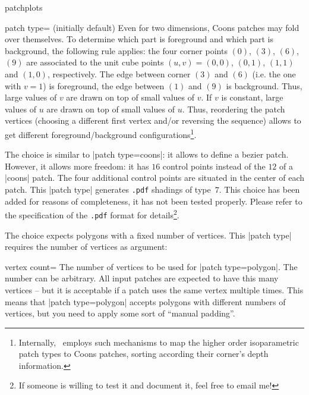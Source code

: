 \begin{pgfplotslibrary}{patchplots}
\begin{pgfplotskey}{patch type= (initially default)}
	Even for two dimensions, Coons patches may fold over themselves. To determine which part is foreground and which part is background, the following rule applies: the four corner points $(0)$, $(3)$, $(6)$, $(9)$ are associated to the unit cube points $(u,v) = (0,0)$, $(0,1)$, $(1,1)$ and $(1,0)$, respectively. The edge between corner $(3)$ and $(6)$ (i.e. the one with $v=1$) is foreground, the edge between $(1)$ and $(9)$ is background. Thus, large values of $v$ are drawn on top of small values of $v$. If $v$ is constant, large values of $u$ are drawn on top of small values of $u$. Thus, reordering the patch vertices (choosing a different first vertex and/or reversing the sequence) allows to get different foreground/background configurations\footnote{Internally, \PGFPlots\ employs such mechanisms to map the higher order isoparametric patch types to Coons patches, sorting according their corner's depth information.}.

	The choice  is similar to |patch type=coons|: it allows to define a bezier patch. However, it allows more freedom: it has $16$ control points instead of the $12$ of a |coons| patch. The four additional control points are situated in the center of each patch. This |patch type| generates \texttt{.pdf} shadings of type~$7$. This choice has been added for reasons of completeness, it has not been tested properly. Please refer to the specification of the \texttt{.pdf} format for details\footnote{If someone is willing to test it and document it, feel free to email me!}.
	

	The choice  expects polygons with a fixed number of vertices. This |patch type| requires the number of vertices as argument:
	\begin{pgfplotskey}{vertex count=}
		The number of vertices to be used for |patch type=polygon|. The number can be arbitrary. All input patches are expected to have this many vertices -- but it is acceptable if a patch uses the same vertex multiple times. This means that |patch type=polygon| accepts polygons with different numbers of vertices, but you need to apply some sort of ``manual padding''.
		

\end{pgfplotskey}
\end{pgfplotskey}
\end{pgfplotslibrary}
